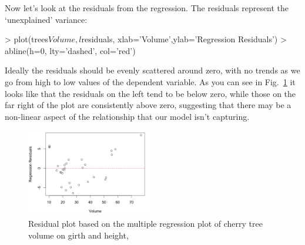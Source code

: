 Now let's look at the residuals from the regression. The residuals represent the `unexplained' variance:
\begin{R}
> plot(trees$Volume,l$residuals, xlab='Volume',ylab='Regression Residuals')
> abline(h=0, lty='dashed', col='red')
\end{R}
%
Ideally the residuals should be evenly scattered around zero, with no trends as we go from high to low values of the dependent variable.  As you can see in Fig.~\ref{fig:trees-resid} it looks like that the residuals on the left tend to be below zero, while those on the far right of the plot are consistently above zero, suggesting that there may be a non-linear aspect of the relationship that our model isn't capturing.
%
\begin{figure}[htbp]
\centering
\includegraphics[height=1.5in]{./figures/hands-on4/trees-residuals.pdf}
\caption{Residual plot based on the multiple regression plot of cherry tree volume on girth and height,\label{fig:trees-resid}}
\end{figure}

